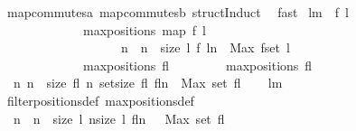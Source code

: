 \begin{isabellebody}
\endisadelimproof
%
\isatagproof
{}\isamarkupfalse%
\ map{\isacharunderscore}commutes{\isacharunderscore}a\ map{\isacharunderscore}commutes{\isacharunderscore}b\ structInduct\ \isamarkupfalse%
\ fast%
\endisatagproof
{\isafoldproof}%
%
\isadelimproof
\isanewline
%
\endisadelimproof
\isanewline
{}\isamarkupfalse%
\ lm{}{}{\isacharcolon}\ \ f\ l\ \isanewline
\ \ \ \ \ \ \ \ \ \ \ \ \ {\isachardoublequoteopen}maxpositions\ {\isacharparenleft}map\ f\ l{\isacharparenright}\ {\isacharequal}\ \isanewline
\ \ \ \ \ \ \ \ \ \ \ \ \ \ \ \ \ \ \ {\isacharbrackleft}n\ {\isachardot}\ n\ {\isacharless}{\isacharminus}\ {\isacharbrackleft}{}{\isachardot}{\isachardot}{\isacharless}size\ l{\isacharbrackright}{\isacharcomma}\ f\ {\isacharparenleft}l{\isacharbang}n{\isacharparenright}\ {\isasymge}\ Max\ {\isacharparenleft}f{\isacharbackquote}{\isacharparenleft}set\ l{\isacharparenright}{\isacharparenright}{\isacharbrackright}{\isachardoublequoteclose}\ \isanewline
\ \ \ \ \ \ \ \ \ \ \ \ {\isacharparenleft}\ {\isachardoublequoteopen}maxpositions\ {\isacharparenleft}{\isacharquery}fl{\isacharparenright}\ {\isacharequal}\ {\isacharunderscore}{\isachardoublequoteclose}{\isacharparenright}\ \isanewline
%
\isadelimproof
%
\endisadelimproof
%
\isatagproof
{}\isamarkupfalse%
\ {\isacharminus}\isanewline
\ \ \isamarkupfalse%
\ {\isachardoublequoteopen}maxpositions\ {\isacharquery}fl\ {\isacharequal}\ \isanewline
\ \ {\isacharbrackleft}n{\isachardot}\ n\ {\isacharless}{\isacharminus}\ {\isacharbrackleft}{}{\isachardot}{\isachardot}{\isacharless}size\ {\isacharquery}fl{\isacharbrackright}{\isacharcomma}\ n{\isasymin}\ set{\isacharbrackleft}{}{\isachardot}{\isachardot}{\isacharless}size\ {\isacharquery}fl{\isacharbrackright}{\isacharcomma}\ {\isacharquery}fl{\isacharbang}n\ {\isasymge}\ Max\ {\isacharparenleft}set\ {\isacharquery}fl{\isacharparenright}{\isacharbrackright}{\isachardoublequoteclose}\isanewline
\ \ \isamarkupfalse%
\ lm{}{}\ \isamarkupfalse%
\ filterpositions{}{\isacharunderscore}def\ maxpositions{\isacharunderscore}def\ \isacommand{{\isachardot}}\isamarkupfalse%
\isanewline
\ \ \isamarkupfalse%
\ \isamarkupfalse%
\ {\isachardoublequoteopen}{\isachardot}{\isachardot}{\isachardot}\ {\isacharequal}\ \isanewline
\ \ {\isacharbrackleft}n\ {\isachardot}\ n\ {\isacharless}{\isacharminus}\ {\isacharbrackleft}{}{\isachardot}{\isachardot}{\isacharless}size\ l{\isacharbrackright}{\isacharcomma}\ {\isacharparenleft}n{\isacharless}size\ l{\isacharparenright}{\isacharcomma}\ {\isacharparenleft}{\isacharquery}fl{\isacharbang}n\ \ {\isasymge}\ Max\ {\isacharparenleft}set\ {\isacharquery}fl{\isacharparenright}{\isacharparenright}{\isacharbrackright}{\isachardoublequoteclose}\ \isamarkupfalse%

\end{isabellebody}
